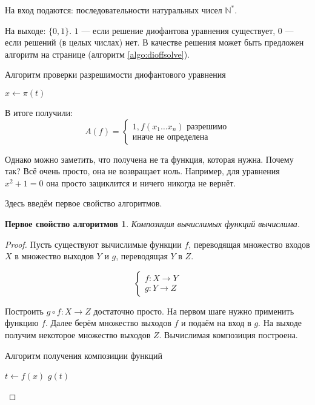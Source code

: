 \documentclass[a4paper, 12pt]{article}
\newtheorem*{algo1}{Первое свойство алгоритмов}
\newcommand{\N}{\mathbb{N}}
\begin{document}
На вход подаются: последовательности натуральных чисел $\N^*$.

На выходе: $\{0,1\}$. $1$ --- если решение диофантова уравнения существует, $0$ --- если решений (в целых числах) нет.
В качестве решения может быть предложен алгоритм на странице
\pageref{algo:dioffsolve} (алгоритм \ref{algo:dioffsolve}).
\begin{algorithm}[!htp]
\caption{Алгоритм проверки разрешимости диофантового уравнения}
\label{algo:dioffsolve}
\begin{algorithmic}[1]
        \State $x \gets \pi(t)$
            \State {}
        \EndIf
    \EndFor
\EndFunction
\end{algorithmic}
\end{algorithm}

В итоге получили:
\[
    A(f) = 
    \begin{cases}
        1, f(x_1 \ldots x_n) \text{ разрешимо} \\
        \text{иначе не определена}
    \end{cases}
\]

Однако можно заметить, что получена не та функция, которая нужна.
Почему так? Всё очень просто, она не возвращает ноль. Например,
для уравнения $x^2 + 1 = 0$ она просто зациклится и ничего
никогда не вернёт.

Здесь введём первое свойство алгоритмов.

\begin{algo1}
Композиция вычислимых функций вычислима.
\end{algo1}
\begin{proof}
Пусть существуют вычислимые функции $f$, переводящая множество входов $X$ в множество выходов $Y$ и $g$, переводящая $Y$ в $Z$.

\[
    \begin{cases}
        f: X \to Y \\
        g: Y \to Z
    \end{cases}
\]

Построить $g \circ f: X \to Z$ достаточно просто. На первом шаге нужно применить функцию $f$. Далее берём множество выходов $f$ и подаём на вход в $g$. На выходе получим некоторое множество выходов $Z$. Вычислимая композиция построена.

\begin{algorithm}
\caption{Алгоритм получения композиции функций}
\begin{algorithmic}[1]
    \State $t \gets f(x)$
    \State \Return $g(t)$
\EndFunction
\end{algorithmic}
\end{algorithm}
\end{proof}
\end{document}
